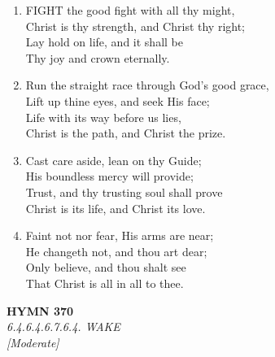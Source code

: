 \begin{enumerate}
    \item FIGHT the good fight with all thy might, \\
        Christ is thy strength, and Christ thy right; \\
        Lay hold on life, and it shall be \\
        Thy joy and crown eternally.

    \item Run the straight race through God's good grace, \\
        Lift up thine eyes, and seek His face; \\
        Life with its way before us lies, \\
        Christ is the path, and Christ the prize.

    \item Cast care aside, lean on thy Guide; \\
        His boundless mercy will provide; \\
        Trust, and thy trusting soul shall prove \\
        Christ is its life, and Christ its love.

    \item Faint not nor fear, His arms are near; \\
        He changeth not, and thou art dear; \\
        Only believe, and thou shalt see \\
        That Christ is all in all to thee.

\end{enumerate}

\newpage
\begin{center}
    {\Large \textbf{HYMN 370}}
    \\
    \textit{6.4.6.4.6.7.6.4. WAKE}
    \\
    \textit{\small [Moderate]}
\end{center}
\vspace{1em}

